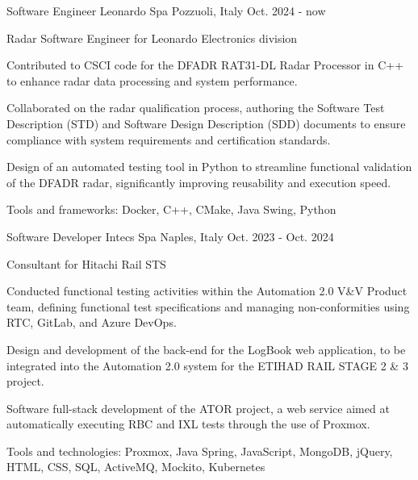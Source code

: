 

\begin{cventries}
  \cventry
    {Software Engineer} %
    {Leonardo Spa} %
    {Pozzuoli, Italy} %
    {Oct. 2024 - now} %
    {
      \begin{cvitems} %
        \item {Radar Software Engineer for Leonardo Electronics division}
        \item {Contributed to CSCI code for the DFADR RAT31-DL Radar Processor in C++ to enhance radar data processing and system performance.}
        \item {Collaborated on the radar qualification process, authoring the Software Test Description (STD) and Software Design Description (SDD) documents to ensure compliance with system requirements and certification standards.}
        \item {Design of an automated testing tool in Python to streamline functional validation of the DFADR radar, significantly improving reusability and execution speed.}
        \item {Tools and frameworks: Docker, C++, CMake, Java Swing, Python}
      \end{cvitems}
    }

  \cventry
    {Software Developer} %
    {Intecs Spa} %
    {Naples, Italy} %
    {Oct. 2023 - Oct. 2024} %
    {
      \begin{cvitems} %
        \item {Consultant for Hitachi Rail STS}
        \item {Conducted functional testing activities within the Automation 2.0 V\&V Product team, defining functional test specifications and managing non-conformities using RTC, GitLab, and Azure DevOps.}
        \item {Design and development of the back-end for the LogBook web application, to be integrated into the Automation 2.0 system for the ETIHAD RAIL STAGE 2 \& 3 project.}
        \item {Software full-stack development of the ATOR project, a web service aimed at automatically executing RBC and IXL tests through the use of Proxmox.}
        \item {Tools and technologies: Proxmox, Java Spring, JavaScript, MongoDB, jQuery, HTML, CSS, SQL, ActiveMQ, Mockito, Kubernetes}
      \end{cvitems}
    }


\end{cventries}
